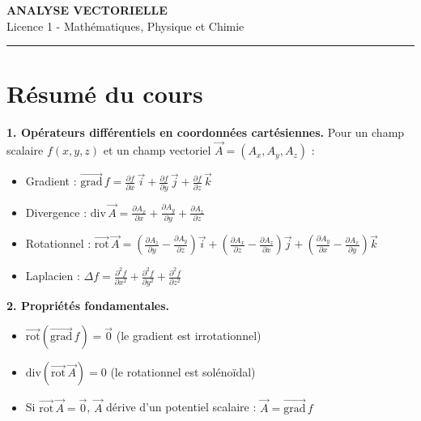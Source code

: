 \documentclass[12pt,a4paper]{article}
\begin{document}
\fi

\begin{center}
  {\LARGE\bfseries ANALYSE VECTORIELLE}\\[0.3cm]
  {\normalsize Licence 1 - Mathématiques, Physique et Chimie}\\[0.1cm]
  \rule{0.7\textwidth}{0.8pt}
\end{center}

\section*{Résumé du cours}

\begin{boiteresume}

\textbf{1. Opérateurs différentiels en coordonnées cartésiennes.} Pour un champ scalaire $f(x,y,z)$ et un champ vectoriel $\vec{A}=(A_x,A_y,A_z)$ :
\begin{itemize}[nosep]
  \item Gradient : $\overrightarrow{\text{grad}}\,f = \frac{\partial f}{\partial x}\,\vec{i} + \frac{\partial f}{\partial y}\,\vec{j} + \frac{\partial f}{\partial z}\,\vec{k}$
  \item Divergence : $\text{div}\,\vec{A} = \frac{\partial A_x}{\partial x}+\frac{\partial A_y}{\partial y}+\frac{\partial A_z}{\partial z}$
  \item Rotationnel : $\overrightarrow{\text{rot}}\,\vec{A} = \left(\frac{\partial A_z}{\partial y}-\frac{\partial A_y}{\partial z}\right)\vec{i} + \left(\frac{\partial A_x}{\partial z}-\frac{\partial A_z}{\partial x}\right)\vec{j} + \left(\frac{\partial A_y}{\partial x}-\frac{\partial A_x}{\partial y}\right)\vec{k}$
  \item Laplacien : $\Delta f = \frac{\partial^2 f}{\partial x^2}+\frac{\partial^2 f}{\partial y^2}+\frac{\partial^2 f}{\partial z^2}$
\end{itemize}

\textbf{2. Propriétés fondamentales.}
\begin{itemize}[nosep]
  \item $\overrightarrow{\text{rot}}(\overrightarrow{\text{grad}}\,f) = \vec{0}$ (le gradient est irrotationnel)
  \item $\text{div}(\overrightarrow{\text{rot}}\,\vec{A}) = 0$ (le rotationnel est solénoïdal)
  \item Si $\overrightarrow{\text{rot}}\,\vec{A}=\vec{0}$, $\vec{A}$ dérive d'un potentiel scalaire : $\vec{A}=\overrightarrow{\text{grad}}\,f$
\end{itemize}


\end{boiteresume}
\end{document}

